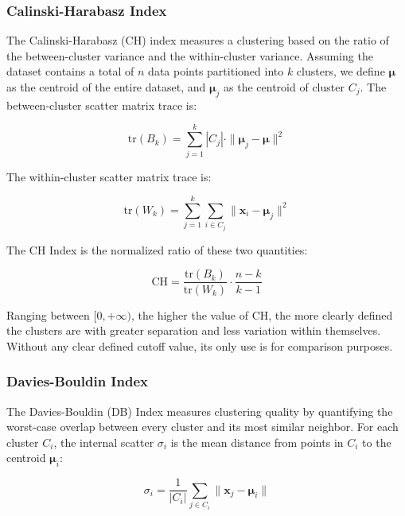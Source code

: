 \subsubsection*{Calinski-Harabasz Index}

The Calinski-Harabasz (CH) index \cite{calinski1974} measures a clustering based on the ratio of the between-cluster variance and the within-cluster variance. Assuming the dataset contains a total of $n$ data points partitioned into $k$ clusters, we define $\boldsymbol{\mu}$ as the centroid of the entire dataset, and $\boldsymbol{\mu}_j$ as the centroid of cluster $C_j$. The between-cluster scatter matrix trace is:

\begin{equation}
    \mathrm{tr}(B_k) = \sum_{j=1}^{k} |C_j| \cdot \|\boldsymbol{\mu}_j - \boldsymbol{\mu}\|^2
    \label{eq:ch_between}
\end{equation}

The within-cluster scatter matrix trace is:

\begin{equation}
    \mathrm{tr}(W_k) = \sum_{j=1}^{k} \sum_{i \in C_j} \|\mathbf{x}_i - \boldsymbol{\mu}_j\|^2
    \label{eq:ch_within}
\end{equation}

The CH Index is the normalized ratio of these two quantities:

\begin{equation}
    \mathrm{CH} = \frac{\mathrm{tr}(B_k)}{\mathrm{tr}(W_k)} \cdot \frac{n - k}{k - 1}
    \label{eq:ch}
\end{equation}

Ranging between $[0, +\infty)$, the higher the value of CH, the more clearly defined the clusters are with greater separation and less variation within themselves. Without any clear defined cutoff value, its only use is for comparison purposes.

\subsubsection*{Davies-Bouldin Index}

The Davies-Bouldin (DB) Index \cite{davies1979} measures clustering quality by quantifying the worst-case overlap between every cluster and its most similar neighbor. For each cluster $C_i$, the internal scatter $\sigma_i$ is the mean distance from points in $C_i$ to the centroid $\boldsymbol{\mu}_i$:

\begin{equation}
    \sigma_i = \frac{1}{|C_i|} \sum_{j \in C_i} \|\mathbf{x}_j - \boldsymbol{\mu}_i\|
    \label{eq:db_sigma}
\end{equation}

